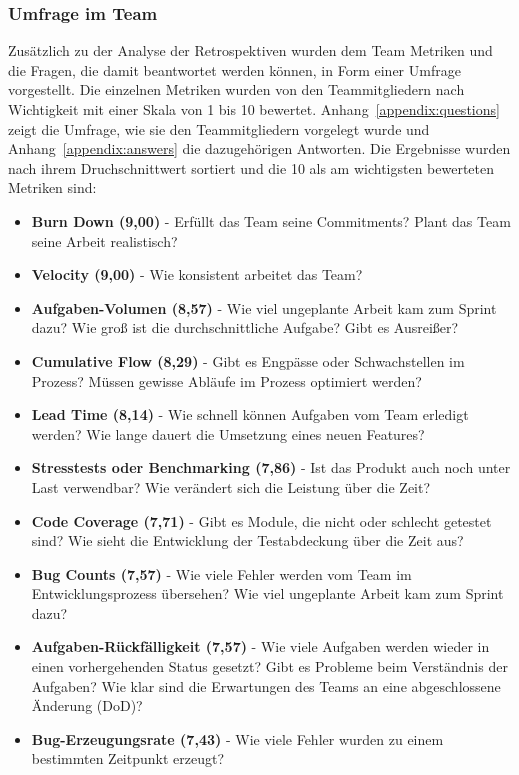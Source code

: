 \subsubsection{Umfrage im Team}

Zusätzlich zu der Analyse der Retrospektiven wurden dem Team Metriken und die Fragen, die damit beantwortet werden können, in Form einer Umfrage vorgestellt.
Die einzelnen Metriken wurden von den Teammitgliedern nach Wichtigkeit mit einer Skala von 1 bis 10 bewertet.
Anhang~\ref{appendix:questions} zeigt die Umfrage, wie sie den Teammitgliedern vorgelegt wurde und Anhang~\ref{appendix:answers} die dazugehörigen Antworten.
Die Ergebnisse wurden nach ihrem Druchschnittwert sortiert und die 10 als am wichtigsten bewerteten Metriken sind:

\begin{itemize}[noitemsep]
    \item \textbf{Burn Down (9,00)} \mbox{-} Erfüllt das Team seine Commitments? Plant das Team seine Arbeit realistisch?
    \item \textbf{Velocity (9,00)} \mbox{-} Wie konsistent arbeitet das Team?
    \item \textbf{Aufgaben-Volumen (8,57)} \mbox{-} Wie viel ungeplante Arbeit kam zum Sprint dazu? Wie groß ist die durchschnittliche Aufgabe? Gibt es Ausreißer?
    \item \textbf{Cumulative Flow (8,29)} \mbox{-} Gibt es Engpässe oder Schwachstellen im Prozess? Müssen gewisse Abläufe im Prozess optimiert werden?
    \item \textbf{Lead Time (8,14)} \mbox{-} Wie schnell können Aufgaben vom Team erledigt werden? Wie lange dauert die Umsetzung eines neuen Features?
    \item \textbf{Stresstests oder Benchmarking (7,86)} \mbox{-} Ist das Produkt auch noch unter Last verwendbar? Wie verändert sich die Leistung über die Zeit?
    \item \textbf{Code Coverage (7,71)} \mbox{-} Gibt es Module, die nicht oder schlecht getestet sind? Wie sieht die Entwicklung der Testabdeckung über die Zeit aus?
    \item \textbf{Bug Counts (7,57)} \mbox{-} Wie viele Fehler werden vom Team im Entwicklungsprozess übersehen? Wie viel ungeplante Arbeit kam zum Sprint dazu?
    \item \textbf{Aufgaben-Rückfälligkeit (7,57)} \mbox{-} Wie viele Aufgaben werden wieder in einen vorhergehenden Status gesetzt? Gibt es Probleme beim Verständnis der Aufgaben? Wie klar sind die Erwartungen des Teams an eine abgeschlossene Änderung (DoD)?
    \item \textbf{Bug-Erzeugungsrate (7,43)} \mbox{-} Wie viele Fehler wurden zu einem bestimmten Zeitpunkt erzeugt?
\end{itemize}

